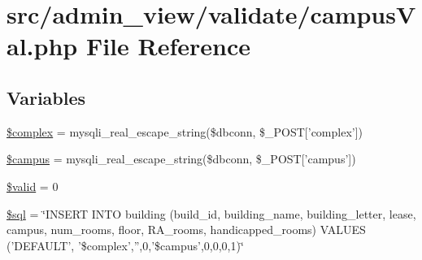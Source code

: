 \hypertarget{campusVal_8php}{\section{src/admin\-\_\-view/validate/campus\-Val.php \-File \-Reference}
\label{campusVal_8php}
}
\subsection*{\-Variables}
\begin{DoxyCompactItemize}
\item 
\hyperlink{campusVal_8php_a25ec02534214977602829622b78b5d78}{\$complex} = mysqli\-\_\-real\-\_\-escape\-\_\-string(\$dbconn, \$\-\_\-\-P\-O\-S\-T\mbox{[}'complex'\mbox{]})
\item 
\hyperlink{campusVal_8php_a6f0655994f3941d6ab50f681032f899b}{\$campus} = mysqli\-\_\-real\-\_\-escape\-\_\-string(\$dbconn, \$\-\_\-\-P\-O\-S\-T\mbox{[}'campus'\mbox{]})
\item 
\hyperlink{campusVal_8php_a0587674d27d00ef497e08e53ccf45bbb}{\$valid} = 0
\item 
\hyperlink{campusVal_8php_a047170d6020a882807665812a27e2525}{\$sql} = \char`\"{}\-I\-N\-S\-E\-R\-T \-I\-N\-T\-O building (build\-\_\-id, building\-\_\-name, building\-\_\-letter, lease, campus, num\-\_\-rooms, floor, \-R\-A\-\_\-rooms, handicapped\-\_\-rooms) \-V\-A\-L\-U\-E\-S ('\-D\-E\-F\-A\-U\-L\-T', '\$complex','',0,'\$campus',0,0,0,1)\char`\"{}
\end{DoxyCompactItemize}


